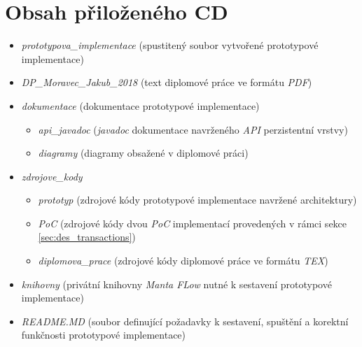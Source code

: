 \documentclass[11pt,twoside,a4paper]{book}
\begin{document}
\chapter{Obsah přiloženého CD}
\label{apx:cd}

\begin{itemize}
   \item{\textit{prototypova\_implementace}} (spustitený soubor vytvořené prototypové implementace)
   \item{\textit{DP\_Moravec\_Jakub\_2018}} (text diplomové práce ve formátu \textit{PDF})
   \item{\textit{dokumentace}} (dokumentace prototypové implementace)
      \begin{itemize}
         \item{\textit{api\_javadoc}} (\textit{javadoc} dokumentace navrženého \textit{API} perzistentní vrstvy)
         \item{\textit{diagramy}} (diagramy obsažené v diplomové práci)
      \end{itemize}
   \item{\textit{zdrojove\_kody}}
      \begin{itemize}
         \item{\textit{prototyp}} (zdrojové kódy prototypové implementace navržené architektury)
         \item{\textit{PoC}} (zdrojové kódy dvou \textit{PoC} implementací provedených v rámci sekce \ref{sec:des_transactions})
         \item{\textit{diplomova\_prace}} (zdrojové kódy diplomové práce ve formátu \textit{TEX})
      \end{itemize}
   \item{\textit{knihovny}} (privátní knihovny \textit{Manta FLow} nutné k sestavení prototypové implementace)
   \item{\textit{README.MD}} (soubor definující požadavky k sestavení, spuštění a korektní funkčnosti prototypové implementace)
\end{itemize}
\end{document}
